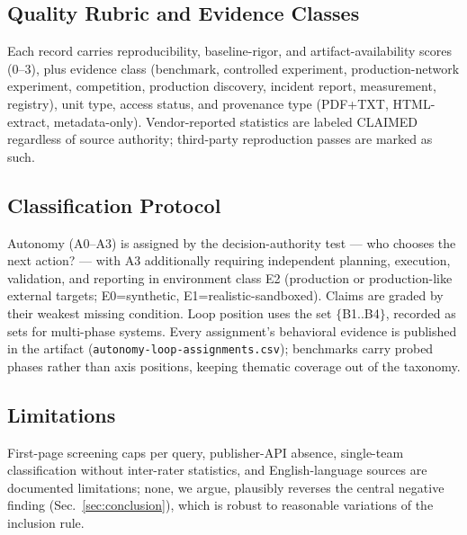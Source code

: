\subsection{Quality Rubric and Evidence Classes}
Each record carries reproducibility, baseline-rigor, and artifact-availability scores (0--3),
plus evidence class (benchmark, controlled experiment, production-network experiment,
competition, production discovery, incident report, measurement, registry), unit type, access
status, and provenance type (PDF+TXT, HTML-extract, metadata-only). Vendor-reported statistics
are labeled CLAIMED regardless of source authority; third-party reproduction passes are marked
as such.

\subsection{Classification Protocol}
Autonomy (A0--A3) is assigned by the decision-authority test --- who chooses the next action? ---
with A3 additionally requiring independent planning, execution, validation, and reporting in
environment class E2 (production or production-like external targets; E0=synthetic,
E1=realistic-sandboxed). Claims are graded by their weakest missing condition. Loop position
uses the set $\{$B1..B4$\}$, recorded as sets for multi-phase systems. Every assignment's
behavioral evidence is published in the artifact (\texttt{autonomy-loop-assignments.csv});
benchmarks carry probed phases rather than axis positions, keeping thematic coverage out of the
taxonomy.

\subsection{Limitations}
First-page screening caps per query, publisher-API absence, single-team classification without
inter-rater statistics, and English-language sources are documented limitations; none, we argue,
plausibly reverses the central negative finding (Sec.~\ref{sec:conclusion}), which is robust to
reasonable variations of the inclusion rule.
